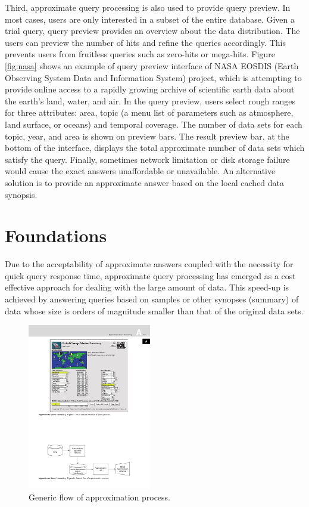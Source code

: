 \documentclass[twocolumn]{article}
\begin{document}
Third, approximate query processing is also used to provide query preview. In most cases, users are only interested in a subset of the entire database. Given a trial query, query preview provides an overview about the data distribution. The users can preview the number of hits and refine the queries accordingly. This prevents users from fruitless queries such as zero-hits or mega-hits. Figure \ref{fig:nasa} shows an example of query preview interface of NASA EOSDIS (Earth Observing System Data and Information System) project, which is attempting to provide online access to a rapidly growing archive of scientific earth data about the earth’s land, water, and air. In the query preview, users select rough ranges for three attributes: area, topic (a menu list of parameters such as atmosphere, land surface, or oceans) and temporal coverage. The number of data sets for each topic, year, and area is shown on preview bars. The result preview bar, at the bottom of the interface, displays the total approximate number of data sets which satisfy the query.
Finally, sometimes network limitation or disk storage failure would cause the exact answers unaffordable or unavailable. An alternative solution is to provide an approximate answer based on the local cached data synopsis.

\section{Foundations}
Due to the acceptability of approximate answers coupled with the necessity for quick query response time, approximate query processing has emerged as a cost effective approach for dealing with the large amount of data. This speed-up is achieved by answering queries based on samples or other synopses (summary) of data whose size is orders of magnitude smaller than that of the original data sets.
\begin{figure}[htb]
        \centering
        \includegraphics[width=0.48\textwidth]{generic-flow.pdf}
        \caption{Generic flow of approximation process.}
        \label{fig:flow}
\end{figure}
\end{document}
